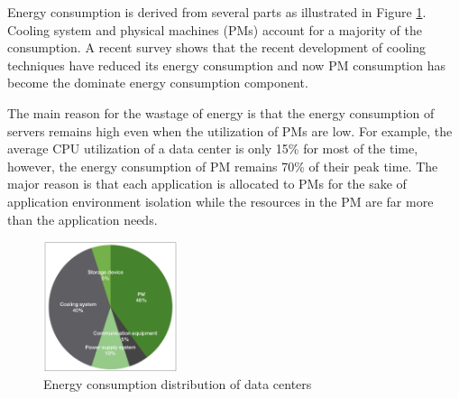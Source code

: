  Energy consumption is derived from several parts as illustrated in Figure \ref{fig:consumption}. Cooling system and physical machines (PMs) account for a majority of the consumption. A recent survey \cite{Cho:2016kz} shows that the recent development of cooling techniques have reduced its energy consumption and now PM consumption has become the dominate energy consumption component. 

 The main reason for the wastage of energy is that the energy consumption of servers remains high even when the utilization of PMs are low. For example, the average CPU utilization of a data center is only 15\% for most of the time, however, the energy consumption of PM remains 70\% of their peak time. The major reason is that each application is allocated to PMs for the sake of application environment isolation while the resources in the PM are far more than the application needs. 



\begin{figure}
	\centering
		\includegraphics[width=0.35\textwidth]{pics/energyConsumption.png}
		\caption{Energy consumption distribution of data centers \cite{Rong:2016js}}
		\label{fig:consumption}
\end{figure} 

